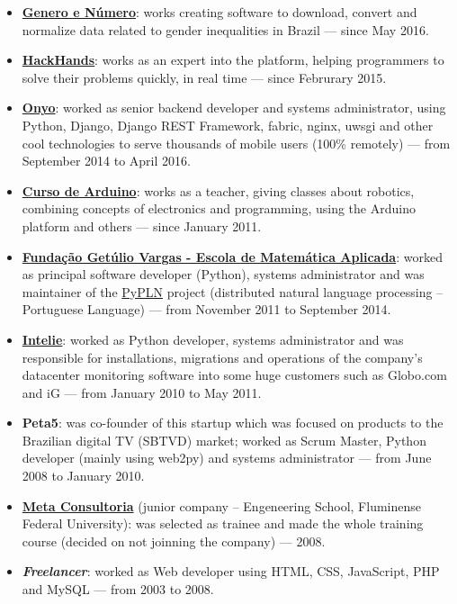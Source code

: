\documentclass[a4paper,11pt]{article}
\begin{document}
	\begin{itemize}
		\item \href{http://generonumero.media}{\textbf{Genero e Número}}: works
			creating software to download, convert and normalize data related
			to gender inequalities in Brazil --- since May 2016.
		\item \href{http://hackhands.com}{\textbf{HackHands}}: works as an
			expert into the platform, helping programmers to solve their
			problems quickly, in real time --- since Februrary 2015.
		\item \href{http://onyo.com}{\textbf{Onyo}}: worked as senior backend
			developer and systems administrator, using Python, Django, Django
			REST Framework, fabric, nginx, uwsgi and other cool technologies to
			serve thousands of mobile users (100\% remotely) --- from September
			2014 to April 2016.
		\item \href{http://www.cursodearduino.com.br/}{\textbf{Curso de
			Arduino}}: works as a teacher, giving classes about robotics,
			combining concepts of electronics and programming, using the
			Arduino platform and others --- since January 2011.
		\item \href{http://emap.fgv.br/}{\textbf{Fundação Getúlio Vargas -
			Escola de Matemática Aplicada}}: worked as principal software
			developer (Python), systems administrator and was maintainer of the
			\href{http://pypln.org/}{PyPLN} project (distributed natural
			language processing -- Portuguese Language) --- from November 2011
			to September 2014.
		\item \href{http://www.intelie.com.br/}{\textbf{Intelie}}: worked as
			Python developer, systems administrator and was responsible for
			installations, migrations and operations of the company's
			datacenter monitoring software into some huge customers such as
			Globo.com and iG --- from January 2010 to May 2011.
		\item \textbf{Peta5}: was co-founder of this startup which was focused
			on products to the Brazilian digital TV (SBTVD) market; worked as
			Scrum Master, Python developer (mainly using web2py) and systems
			administrator --- from June 2008 to January 2010.
		\item \href{http://www.metaconsultoria.com/}{\textbf{Meta Consultoria}}
			(junior company -- Engeneering School, Fluminense Federal
			University): was selected as trainee and made the whole training
			course (decided on not joinning the company) --- 2008.
		\item \textbf{\textit{Freelancer}}: worked as Web developer using HTML,
			CSS, JavaScript, PHP and MySQL --- from 2003 to 2008.
	\end{itemize}
\end{document}
